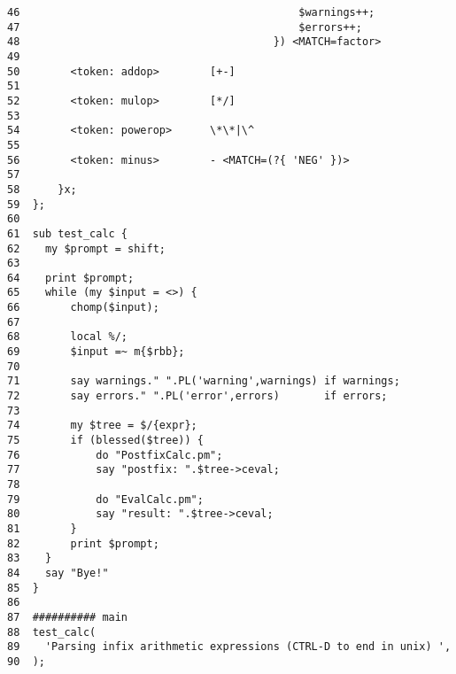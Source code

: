 \begin{verbatim}
46                                            $warnings++;
47                                            $errors++;
48                                        }) <MATCH=factor>
49
50        <token: addop>        [+-]
51
52        <token: mulop>        [*/]
53
54        <token: powerop>      \*\*|\^
55
56        <token: minus>        - <MATCH=(?{ 'NEG' })>
57
58      }x;
59  };
60
61  sub test_calc {
62    my $prompt = shift;
63
64    print $prompt;
65    while (my $input = <>) {
66        chomp($input);
67
68        local %/;
69        $input =~ m{$rbb};
70
71        say warnings." ".PL('warning',warnings) if warnings;
72        say errors." ".PL('error',errors)       if errors;
73
74        my $tree = $/{expr};
75        if (blessed($tree)) {
76            do "PostfixCalc.pm";
77            say "postfix: ".$tree->ceval;
78
79            do "EvalCalc.pm";
80            say "result: ".$tree->ceval;
81        }
82        print $prompt;
83    }
84    say "Bye!"
85  }
86
87  ########## main
88  test_calc(
89    'Parsing infix arithmetic expressions (CTRL-D to end in unix) ',
90  );
\end{verbatim}

